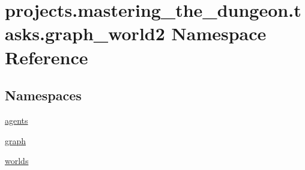 \hypertarget{namespaceprojects_1_1mastering__the__dungeon_1_1tasks_1_1graph__world2}{}\section{projects.\+mastering\+\_\+the\+\_\+dungeon.\+tasks.\+graph\+\_\+world2 Namespace Reference}
\label{namespaceprojects_1_1mastering__the__dungeon_1_1tasks_1_1graph__world2}
\subsection*{Namespaces}
\begin{DoxyCompactItemize}
\item 
 \hyperlink{namespaceprojects_1_1mastering__the__dungeon_1_1tasks_1_1graph__world2_1_1agents}{agents}
\item 
 \hyperlink{namespaceprojects_1_1mastering__the__dungeon_1_1tasks_1_1graph__world2_1_1graph}{graph}
\item 
 \hyperlink{namespaceprojects_1_1mastering__the__dungeon_1_1tasks_1_1graph__world2_1_1worlds}{worlds}
\end{DoxyCompactItemize}
